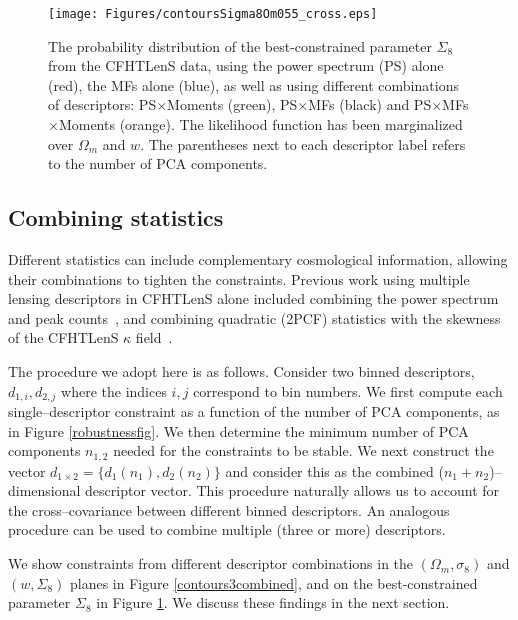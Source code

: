 \documentclass[reprint,aps,prd,superscriptaddress,showkeys,showpacs]{revtex4-1}
\begin{document}
\begin{figure}
\begin{center}
\texttt{[image: Figures/contoursSigma8Om055\_cross.eps]}
\end{center}
\caption{The probability distribution of the best-constrained
  parameter $\Sigma_8$ from the CFHTLenS data, using the power
  spectrum (PS) alone (red), the MFs alone (blue), as well as using
  different combinations of descriptors: PS$\times$Moments (green),
  PS$\times$MFs (black) and PS$\times$MFs$\times$Moments (orange).
  The likelihood function has been marginalized over $\Omega_m$ and
  $w$. The parentheses next to each descriptor label refers to the
  number of PCA components.}
\label{likelihoodSi8cross}
\end{figure}

\subsection{Combining statistics}

Different statistics can include complementary cosmological
information, allowing their combinations to tighten the
constraints. Previous work using multiple lensing descriptors in
CFHTLenS alone included combining the power spectrum and peak
counts~\citep{Companion}, and combining quadratic (2PCF) statistics
with the skewness of the CFHTLenS $\kappa$ field~\citep{CFHTFu}.

The procedure we adopt here is as follows. Consider two binned
descriptors, $d_{1,i},d_{2,j}$ where the indices $i,j$ correspond to
bin numbers.  We first compute each single--descriptor constraint as a
function of the number of PCA components, as in Figure
\ref{robustnessfig}. We then determine the minimum number of PCA
components $n_{1,2}$ needed for the constraints to be stable. We next
construct the vector $d_{1\times2} = \{d_1(n_1),d_2(n_2)\}$ and
consider this as the combined ($n_1+n_2$)--dimensional descriptor
vector. This procedure naturally allows us to account for the
cross--covariance between different binned descriptors. An analogous
procedure can be used to combine multiple (three or more)
descriptors. 


We show constraints from different descriptor combinations in the
$(\Omega_m,\sigma_8)$ and $(w,\Sigma_8)$ planes in Figure
\ref{contours3combined}, and on the best-constrained parameter
$\Sigma_8$ in Figure \ref{likelihoodSi8cross}. We discuss these
findings in the next section.
\end{document}
